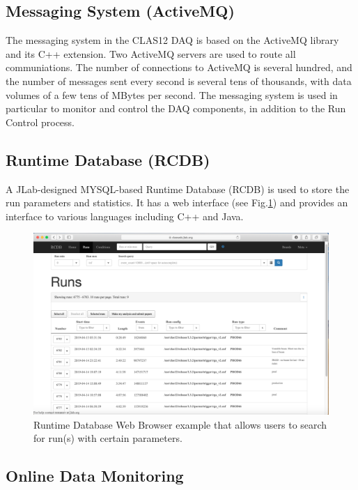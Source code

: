 \subsection{Messaging System (ActiveMQ)}

The messaging system in the CLAS12 DAQ is based on the ActiveMQ library and its C++ extension. Two ActiveMQ servers are used to route all communiations. The number of connections to ActiveMQ is several hundred, and the number of messages sent every second is several tens of thousands, with data volumes of a few tens of MBytes per second. The messaging system is used in particular to monitor and control the DAQ components, in addition to the Run Control process.


\subsection{Runtime Database (RCDB)}

A JLab-designed MYSQL-based Runtime Database (RCDB) is used to store the run parameters and statistics. It has a web interface (see Fig.\ref{fig:rcdb}) and provides an interface to various languages including C++ and Java.

\begin{figure}[hbt]
	\centering
	\includegraphics[width=1.0\columnwidth,keepaspectratio]{img/rcdb.png}
	\caption{Runtime Database Web Browser example that allows users to search for run(s) with certain parameters.}
	\label{fig:rcdb}
\end{figure}

\subsection{Online Data Monitoring}

